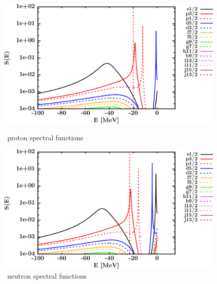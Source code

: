 \begin{figure}[hbtp]
    \centering
    \begin{minipage}{0.42\textwidth}
        \centering
        \includegraphics[width=\textwidth]{figures/o16_protonSpectralFunctions.png}
        \caption*{\oSix\ proton spectral functions}
        \label{DOMFitData_o16_proton_spectralFunctions}
    \end{minipage}\hspace{6pt}
    \begin{minipage}{0.42\textwidth}
        \centering
        \includegraphics[width=\linewidth]{figures/o16_neutronSpectralFunctions.png}
        \caption*{\oSix\ neutron spectral functions}
        \label{DOMFitData_o16_neutron_spectralFunctions}
    \end{minipage}
\end{figure}
\afterpage{\clearpage}
